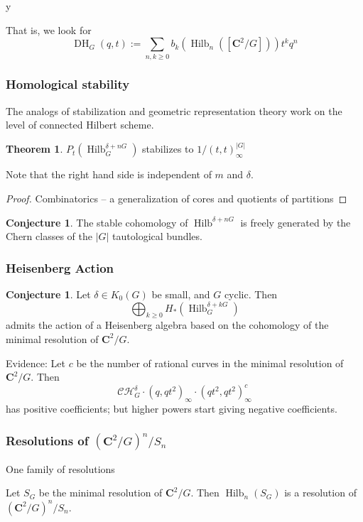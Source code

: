 y\documentclass{amsart}[12pt]
\theoremstyle{definition}
\newtheorem{theorem}[dummy]{Theorem}
\newtheorem{conjecture}[dummy]{Conjecture}
\newcommand{\C}{\mathbf{C}}
\DeclareMathOperator{\Hilb}{Hilb}
\DeclareMathOperator{\DC}{DH}
\begin{document}
That is, we look for 
$$\DC_G(q,t):=\sum_{n,k\geq 0 } b_k(\Hilb_n([\C^2/G])) t^kq^n$$







\subsubsection{Homological stability}

The analogs of stabilization and geometric representation theory work on the level of connected Hilbert scheme.

\begin{theorem} 
$P_t(\Hilb^{\delta+nG}_G)$ stabilizes to $1/(t,t)_\infty^{|G|}$
\end{theorem}
Note that the right hand side is independent of $m$ and $\delta$.
\begin{proof} Combinatorics -- a generalization of cores and quotients of partitions \end{proof}

\begin{conjecture}
The stable cohomology of $\Hilb^{\delta+nG}$ is freely generated by the Chern classes of the $|G|$ tautological bundles.
\end{conjecture}



\subsubsection{Heisenberg Action}


\begin{conjecture}
Let $\delta\in K_0(G)$ be small, and $G$ cyclic.  Then
$$\bigoplus_{k\geq 0} H_*(\Hilb^{\delta+kG}_G)$$ admits the action of a Heisenberg algebra based on the cohomology of the minimal resolution of $\C^2/G$.
\end{conjecture}

Evidence:
Let $c$ be the number of rational curves in the minimal resolution of $\C^2/G$.  Then
$$\mathcal{CH}^\delta_G\cdot(q,qt^2)_\infty\cdot (qt^2,qt^2)_\infty^c$$
has positive coefficients; but higher powers start giving negative coefficients.


\subsubsection{Resolutions of $(\C^2/G)^n/S_n$}
One family of resolutions

Let $S_G$ be the minimal resolution of $\C^2/G$.  Then $\Hilb_n(S_G)$ is a resolution of $(\C^2/G)^n/S_n$.
\end{document}
